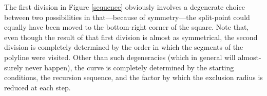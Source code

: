 \documentclass[12pt]{article}
\begin{document}
The first division in Figure \ref{sequence} obviously involves a
degenerate choice between two possibilities in that---because of
symmetry---the split-point could equally have been moved to the
bottom-right corner of the square.  Note that, even though the result
of that first division is almost as symmetrical, the second division
is completely determined by the order in which the segments of the
polyline were visited.  Other than such degeneracies (which in general
will almost-surely never happen), the curve is completely determined
by the starting conditions, the recursion sequence, and the factor by
which the exclusion radius is reduced at each step.

\begin{figure}[h!]
 \begin{center} 

\end{center}
\end{figure}
\end{document}
